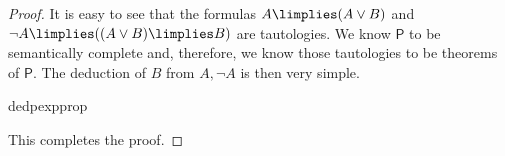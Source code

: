 \begin{proof}
It is easy to see that the formulas $A\limplies (A\lor B)$ and $\lnot A \limplies ( (A\lor B) \limplies B )$ are tautologies. We know $\mathsf{P}$ to be semantically complete and, therefore, we know those tautologies to be theorems of $\mathsf{P}$. The deduction of $B$ from $A,\lnot A$ is then very simple.
\begin{deduction}{dedpexpprop}
\end{deduction}
This completes the proof.
\end{proof}


